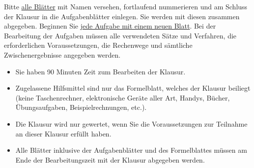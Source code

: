 \documentclass[12pt]{article}
\begin{document}
\maketitle
\thispagestyle{empty}
%
Bitte \underline{alle Blätter} mit Namen versehen, fortlaufend
nummerieren und am Schluss der Klausur in die Aufgabenblätter
einlegen. Sie werden mit diesen zusammen abgegeben. Beginnen Sie
\underline{jede Aufgabe mit einem neuen Blatt}. Bei der Bearbeitung
der Aufgaben müssen alle verwendeten Sätze und Verfahren, die
erforderlichen Voraussetzungen, die Rechenwege und sämtliche
Zwischenergebnisse angegeben werden.
%
\begin{itemize}
  \item Sie haben 90 Minuten Zeit zum Bearbeiten der Klausur.
  \item Zugelassene Hilfsmittel sind nur das Formelblatt, welches der Klausur beiliegt
  (keine Taschenrechner, elektronische Geräte aller Art, Handys, Bücher, Übungsaufgaben, Beispielrechnungen, etc.).
  \item Die Klausur wird nur gewertet, wenn Sie die Voraussetzungen zur Teilnahme an dieser
  Klausur erfüllt haben.
  \item Alle Blätter inklusive der Aufgabenblätter und des Formelblattes müssen am
  Ende der Bearbeitungszeit mit der Klausur abgegeben werden.
\end{itemize}
%
\vspace{1cm}
%
%
\newpage
%
%
%
%
\end{document}
